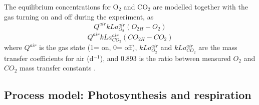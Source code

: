 \documentclass{ruthesis}
\begin{document}
The equilibrium concentrations for O$_2$ and CO$_2$ are modelled together with the gas turning on and off during the experiment, as
\begin{equation}
 Q^{air} kLa_{O_2}^{air} (O_{2H} - O_{2})
\end{equation}
\begin{equation}
 Q^{air} kLa_{CO_2}^{air} (CO_{2H} - CO_{2})
\end{equation}
where $Q^{air}$ is the gas state (1= on, 0= off), $kLa_{O_2}^{air}$ and $kLa_{CO_2}^{air}$ are the mass transfer coefficients for air (d$^{-1}$), and 0.893 is the ratio between measured $O_2$ and $CO_2$ mass transfer constants \cite{grima1993gas}.



\subsection{Process model: Photosynthesis and respiration}
\end{document}
